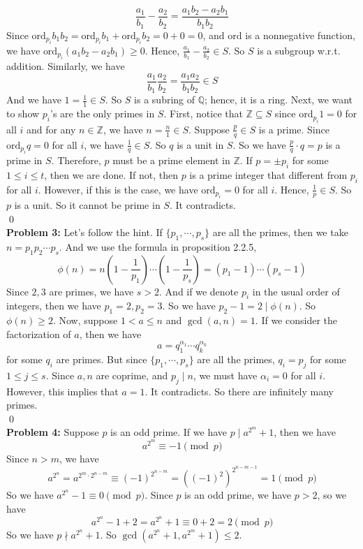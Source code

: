 \documentclass[12pt]{amsart}
\newcommand{\Q}{\mathbb{Q}}
\newcommand{\Z}{\mathbb{Z}}
\newcommand{\ord}{\text{ord}}
\begin{document}
\[\frac{a_1}{b_1}-\frac{a_2}{b_2}=\frac{a_1b_2-a_2b_1}{b_1b_2}\]
Since $\ord_{p_i} b_1b_2=\ord_{p_i}b_1+\ord_{p_i}b_2=0+0=0$, and $\ord$ is a nonnegative function, we have $\ord_{p_i}(a_1b_2-a_2b_1)\geq 0$. Hence, $\frac{a_1}{b_1}-\frac{a_2}{b_2}\in S$. So $S$ is a subgroup w.r.t. addition. Similarly, we have 
\[\frac{a_1}{b_1}\frac{a_2}{b_2}=\frac{a_1a_2}{b_1b_2}\in S\]
And we have $1=\frac{1}{1}\in S$. So $S$ is a subring of $\Q$; hence, it is a ring. Next, we want to show $p_i$'s are the only primes in $S$. First, notice that $\Z\subseteq S$ since $\ord_{p_i}1=0$ for all $i$ and for any $n\in\Z$, we have $n=\frac{n}{1}\in S$. Suppose $\frac{p}{q}\in S$ is a prime. Since $\ord_{p_i}q=0$ for all $i$, we have $\frac{1}{q}\in S$. So $q$ is a unit in $S$. So we have $\frac{p}{q}\cdot q=p$ is a prime in $S$. Therefore, $p$ must be a prime element in $\Z$. If $p=\pm p_i$ for some $1\leq i\leq t$, then we are done. If not, then $p$ is a prime integer that different from $p_i$ for all $i$. However, if this is the case, we have $\ord_{p_i}=0$ for all $i$. Hence, $\frac{1}{p}\in S$. So $p$ is a unit. So it cannot be prime in $S$. It contradicts.
\\\qed\\
\textbf{Problem 3:} Let's follow the hint. If $\{p_1,\cdots, p_s\}$ are all the primes, then we take $n=p_1p_2\cdots p_s$. And we use the formula in proposition 2.2.5,
\[\phi(n)=n(1-\frac{1}{p_1})\cdots (1-\frac{1}{p_s})=(p_1-1)\cdots (p_s-1)\]
Since $2,3$ are primes, we have $s>2$. And if we denote $p_i$ in the usual order of integers, then we have $p_1=2,p_2=3$. So we have $p_2-1=2\mid \phi(n)$. So $\phi(n)\geq 2$. Now, suppose $1<a\leq n$ and $\gcd(a,n)=1$. If we consider the factorization of $a$, then we have 
\[a=q_1^{\alpha_1}\cdots q_k^{\alpha_k}\]
for some $q_i$ are primes. But since $\{p_1,\cdots,p_s\}$ are all the primes, $q_i=p_j$ for some $1\leq j\leq s$. Since $a,n$ are coprime, and $p_j\mid n$, we must have $\alpha_i=0$ for all $i$. However, this implies that $a=1$. It contradicts. So there are infinitely many primes.
\\\qed\\
\textbf{Problem 4:} Suppose $p$ is an odd prime. If we have $p\mid a^{2^m}+1$, then we have 
\[a^{2^m}\equiv -1\pmod p\]
Since $n>m$, we have 
\[a^{2^n}=a^{2^m\cdot 2^{n-m}}\equiv (-1)^{2^{n-m}}=((-1)^2)^{2^{n-m-1}}=1\pmod p\]
So we have $a^{2^n}-1\equiv 0\pmod p$. Since $p$ is an odd prime, we have $p>2$, so we have 
\[a^{2^n}-1+2=a^{2^n}+1\equiv 0+2=2\pmod p\]
So we have $p\nmid a^{2^n}+1$. So $\gcd(a^{2^n}+1,a^{2^m}+1)\leq 2$.
\end{document}
